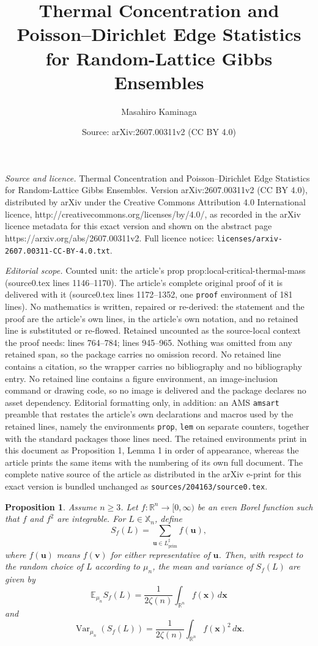 \documentclass[10pt,a4paper]{amsart}
\title{Thermal Concentration and Poisson--Dirichlet Edge Statistics for Random-Lattice Gibbs Ensembles}
\author{Masahiro Kaminaga}
\date{Source: arXiv:2607.00311v2 (CC BY 4.0)}
\newtheorem{prop}{Proposition}
\newcommand{\Var}{\operatorname{Var}}
\newcommand{\ex}{\mathbb E}
\newcommand{\prim}{\operatorname{prim}}
\newcommand{\re}{\mathbb R}
\begin{document}
\maketitle

\noindent\emph{Source and licence.} Thermal Concentration and Poisson--Dirichlet Edge Statistics for Random-Lattice Gibbs Ensembles. Version arXiv:2607.00311v2 (CC BY 4.0), distributed by arXiv under the Creative Commons Attribution 4.0 International licence, http://creativecommons.org/licenses/by/4.0/, as recorded in the arXiv licence metadata for this exact version and shown on the abstract page https://arxiv.org/abs/2607.00311v2. Full licence notice: \texttt{licenses/arxiv-2607.00311-CC-BY-4.0.txt}.\par\smallskip

\noindent\textit{Editorial scope.} Counted unit: the article's prop prop:local-critical-thermal-mass (source0.tex lines 1146--1170). The article's complete original proof of it is delivered with it (source0.tex lines 1172--1352, one \texttt{proof} environment of 181 lines). No mathematics is written, repaired or re-derived: the statement and the proof are the article's own lines, in the article's own notation, and no retained line is substituted or re-flowed.  Retained uncounted as the source-local context the proof needs: lines 764--784; lines 945--965.  Nothing was omitted from any retained span, so the package carries no omission record.  No retained line contains a citation, so the wrapper carries no bibliography and no bibliography entry.  No retained line contains a figure environment, an image-inclusion command or drawing code, so no image is delivered and the package declares no asset dependency.  Editorial formatting only, in addition: an AMS \texttt{amsart} preamble that restates the article's own declarations and macros used by the retained lines, namely the environments \texttt{prop}, \texttt{lem} on separate counters, together with the standard packages those lines need.  The retained environments print in this document as Proposition 1, Lemma 1 in order of appearance, whereas the article prints the same items with the numbering of its own full document.  The complete native source of the article as distributed in the arXiv e-print for this exact version is bundled unchanged as \texttt{sources/204163/source0.tex}.
\begin{prop}
\label{prop:weighted}
Assume $n\ge3$.
Let $f:\re^n\to[0,\infty)$ be an even Borel function such that $f$ and $f^2$ are integrable.
For $L\in\mathbb X_n$, define
$$
S_f(L)=\sum_{\bm u\in L_{\prim}^\sharp} f(\bm u),
$$
where $f(\bm u)$ means $f(\bm v)$ for either representative of $\bm u$.
Then, with respect to the random choice of $L$ according to $\mu_n$, the
mean and variance of $S_f(L)$ are given by 
$$
\ex_{\mu_n}S_f(L)=
\frac{1}{2\zeta(n)}\int_{\re^n}f(\bm x)\,d\bm x
$$
and
$$
\Var_{\mu_n}(S_f(L))=
\frac{1}{2\zeta(n)}\int_{\re^n}f(\bm x)^2\,d\bm x.
$$
\end{prop}
\end{document}
